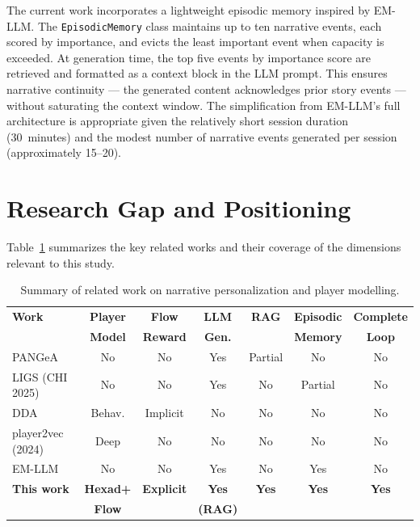 \documentclass[12pt,a4paper]{report}
\begin{document}
The current work incorporates a lightweight episodic memory inspired by EM-LLM. The \texttt{EpisodicMemory} class maintains up to ten narrative events, each scored by importance, and evicts the least important event when capacity is exceeded. At generation time, the top five events by importance score are retrieved and formatted as a context block in the LLM prompt. This ensures narrative continuity --- the generated content acknowledges prior story events --- without saturating the context window. The simplification from EM-LLM's full architecture is appropriate given the relatively short session duration (30~minutes) and the modest number of narrative events generated per session (approximately 15--20).

\section{Research Gap and Positioning}

Table~\ref{tab:related_work} summarizes the key related works and their coverage of the dimensions relevant to this study.

\begin{table}[H]
\centering
\caption{Summary of related work on narrative personalization and player modelling.}
\label{tab:related_work}
\small
\begin{tabular}{@{}lcccccc@{}}
\toprule
\textbf{Work} & \textbf{Player} & \textbf{Flow} & \textbf{LLM} & \textbf{RAG} & \textbf{Episodic} & \textbf{Complete} \\
 & \textbf{Model} & \textbf{Reward} & \textbf{Gen.} & & \textbf{Memory} & \textbf{Loop} \\
\midrule
PANGeA \citep{todd2024pangea} & No & No & Yes & Partial & No & No \\
LIGS (CHI 2025) & No & No & Yes & No & Partial & No \\
DDA \citep{hunicke2004ai} & Behav. & Implicit & No & No & No & No \\
player2vec (2024) & Deep & No & No & No & No & No \\
EM-LLM \citep{fountas2024episodic} & No & No & Yes & No & Yes & No \\
\textbf{This work} & \textbf{Hexad+} & \textbf{Explicit} & \textbf{Yes} & \textbf{Yes} & \textbf{Yes} & \textbf{Yes} \\
 & \textbf{Flow} & & \textbf{(RAG)} & & & \\
\bottomrule
\end{tabular}
\end{table}
\end{document}

